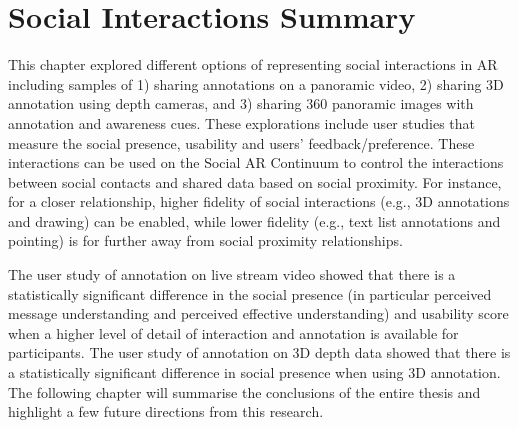 \pagebreak
\section{Social Interactions Summary}

This chapter explored different options of representing social interactions in AR including samples of 1) sharing annotations on a panoramic video, 2) sharing 3D annotation using depth cameras, and 3) sharing 360 panoramic images with annotation and awareness cues. These explorations include user studies that measure the social presence, usability and users' feedback/preference. These interactions can be used on the Social AR Continuum to control the interactions between social contacts and shared data based on social proximity. For instance, for a closer relationship, higher fidelity of social interactions (e.g., 3D annotations and drawing) can be enabled, while lower fidelity (e.g., text list annotations and pointing) is for further away from social proximity relationships.

The user study of annotation on live stream video showed that there is a statistically significant difference in the social presence (in particular perceived message understanding and perceived effective understanding) and usability score when a higher level of detail of interaction and annotation is available for participants. The user study of annotation on 3D depth data showed that there is a statistically significant difference in social presence when using 3D annotation. 
The following chapter will summarise the conclusions of the entire thesis and highlight a few future directions from this research.
